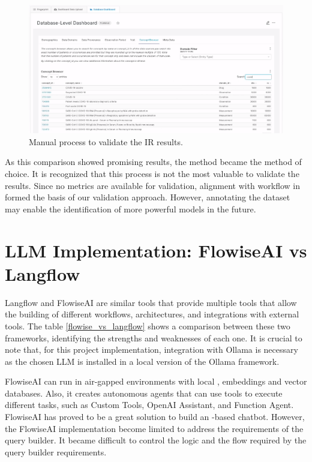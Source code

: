 \begin{figure}[H]
    \includegraphics[width=\textwidth]{figs/chapter5/concept_browser.png}
    \centering
	\caption{Manual process to validate the IR results.}
    \label{fig_ir_sol}
\end{figure}



As this comparison showed promising results, the {\bm} method became the method of choice. It is recognized that this process is not the most valuable to validate the results. Since no metrics are available for validation, alignment with workflow in {\ehden} formed the basis of our validation approach. However, annotating the dataset may enable the identification of more powerful {\ir} models in the future.



\section{LLM Implementation: FlowiseAI vs Langflow}

Langflow and FlowiseAI are similar tools that provide multiple tools that allow the building of different workflows, architectures, and integrations with external tools. The table \ref{flowise_vs_langflow} shows a comparison between these two frameworks, identifying the strengths and weaknesses of each one. It is crucial to note that, for this project implementation, integration with Ollama is necessary as the chosen LLM is installed in a local version of the Ollama framework. 

FlowiseAI can run in air-gapped environments with local {\llm}, embeddings and vector databases. Also, it creates autonomous agents that can use tools to execute different tasks, such as Custom Tools, OpenAI Assistant, and Function Agent. FlowiseAI has proved to be a great solution to build an {\llm}-based chatbot. However, the FlowiseAI implementation become limited to address the requirements of the query builder. It became difficult to control the logic and the flow required by the query builder requirements. 

